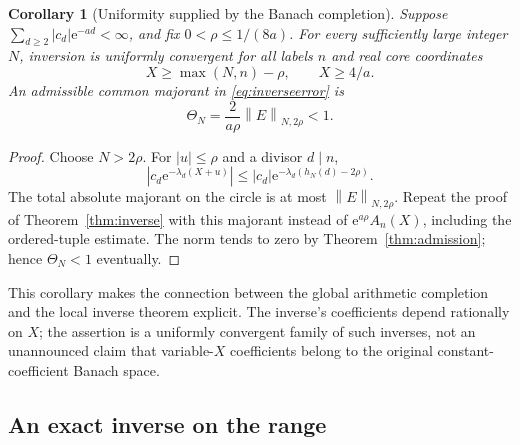 \documentclass[11pt,a4paper]{article}
\numberwithin{equation}{section}
\newtheorem{corollary}[theorem]{Corollary}
\theoremstyle{definition}
\theoremstyle{remark}
\newcommand{\ee}{\mathrm e}
\newcommand{\norm}[1]{\left\|#1\right\|}
\begin{document}
\begin{corollary}[Uniformity supplied by the Banach completion]
\label{cor:uniforminverse}
Suppose $\sum_{d\ge2}|c_d|\ee^{-ad}<\infty$, and fix
$0<\rho\le1/(8a)$. For every sufficiently large integer $N$, inversion
is uniformly convergent for all labels $n$ and real core coordinates
\begin{equation}
 X\ge\max(N,n)-\rho,\qquad X\ge4/a.
 \label{eq:uniformdomain}
\end{equation}
An admissible common majorant in \eqref{eq:inverseerror} is
\begin{equation}
 \Theta_N=\frac{2}{a\rho}\norm{E}_{N,2\rho}<1.
 \label{eq:ThetaN}
\end{equation}
\end{corollary}
\begin{proof}
Choose $N>2\rho$. For $|u|\le\rho$ and a divisor $d\mid n$,
\[
 |c_d\ee^{-\lambda_d(X+u)}|
 \le |c_d|\ee^{-\lambda_d(h_N(d)-2\rho)}.
\]
The total absolute majorant on the circle is at most
$\norm{E}_{N,2\rho}$. Repeat the proof of Theorem~\ref{thm:inverse}
with this majorant instead of $\ee^{a\rho}A_n(X)$, including the
ordered-tuple estimate. The norm tends to zero by
Theorem~\ref{thm:admission}; hence $\Theta_N<1$ eventually.
\end{proof}

This corollary makes the connection between the global arithmetic
completion and the local inverse theorem explicit. The inverse's
coefficients depend rationally on $X$; the assertion is a uniformly
convergent family of such inverses, not an unannounced claim that
variable-$X$ coefficients belong to the original constant-coefficient
Banach space.

\subsection{An exact inverse on the range}
\end{document}
